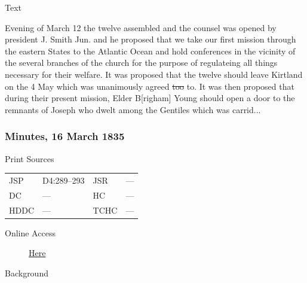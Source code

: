			\begin{description}
				\item[Text]
			\end{description}
			
				Evening of March 12 the twelve assembled and the counsel was opened by president J. Smith Jun. and he proposed that we take our first mission through the eastern States to the Atlantic Ocean and hold conferences in the vicinity of the several branches of the church for the purpose of regulateing all things necessary for their welfare. It was proposed that the twelve should leave Kirtland on the 4 May which was unanimously agreed \sout{too} to. It was then proposed that during their present mission, Elder B[righam] Young should open a door to the remnants of Joseph who dwelt among the Gentiles which was carrid...
				
		\subsubsection{Minutes, 16 March 1835}
			\label{EMS-1835-JS-16-MAR-1835}
			
			\begin{description}
				\item[Print Sources]
			\end{description}

				\begin{tabular}{p{0.5in}p{1in}p{0.5in}p{1in}}
				JSP	 	& D4:289--293		& JSR 		& --- \\
				DC	 	& --- 				& HC 		& --- \\
				HDDC 	& ---				& TCHC 		& --- \\
				\end{tabular}
			
			\begin{description}
				\item[Online Access] \href{https://www.josephsmithpapers.org/paper-summary/minutes-16-march-1835/1}{Here}
			\end{description}
			
			\begin{description}
				\item[Background]
			\end{description}
			

